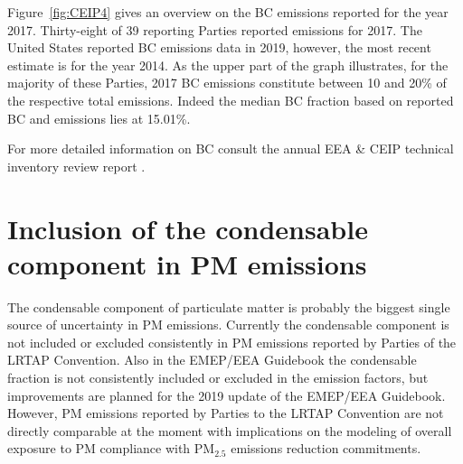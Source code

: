 {Figure~\ref{fig:CEIP4}  gives an overview on the BC emissions reported for the year 2017. Thirty-eight of 39 reporting Parties reported
emissions for 2017. The United States reported BC emissions data in 2019, however, the most recent estimate is for the
year 2014. As the upper part of the graph illustrates, for the majority of these Parties, 2017 BC emissions constitute
between 10 and 20\% of the respective total \pmfine emissions. Indeed the median BC fraction based on reported BC and
\pmfine emissions lies at 15.01\%.


For more detailed information on BC consult the annual EEA \& CEIP technical inventory review report \citep{CEIP2019}.

\section{Inclusion of the condensable component in PM emissions}
\label{sec:EmisSVOC}

The condensable component of particulate matter is probably the biggest single source of uncertainty in PM emissions.
Currently the condensable component is not included or excluded consistently in PM emissions reported by Parties
of the LRTAP Convention. Also in the EMEP/EEA Guidebook \citep{EmisInvGuide2016} the condensable fraction is not consistently included or
excluded in the emission factors, but improvements are planned for the 2019 update
of the EMEP/EEA Guidebook. However, PM emissions reported by Parties to the LRTAP Convention are not directly
comparable at the moment with implications on the modeling of overall exposure to PM compliance with PM$_{2.5}$ emissions
reduction commitments.




}
